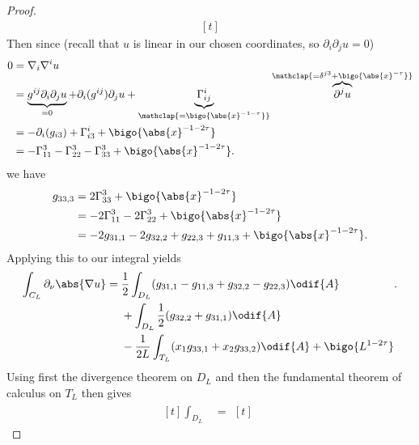 \documentclass[titlepage,numbers=noenddot,oneside,%
cleardoublepage=empty,paper=a4,fontsize=11pt,%
english,%
]{scrartcl}
\begin{document}
\begin{proof}
\begin{equation}
\begin{aligned}[t]
        \end{aligned}
    \end{equation}
    Then since (recall that \( u \) is linear in our chosen coordinates, so \( \partial_i\partial_j u=0 \))
    \begin{equation*}
        \begin{aligned}[t]
            0&=\nabla_i \nabla^i u\\
            &=\underbrace{g^{ij}\partial_i \partial_j u}_{=0}+\partial_i(g^{ij}) \partial_j u+\underbrace{\Gamma^{i}_{ij}}_{\mathclap{=\bigo{\abs{x}^{-1-\tau}}}}\overbrace{\partial^j u}^{\smash{\mathclap{=\delta^{j3}+\bigo{\abs{x}^{-\tau}}}}}\\
            &=-\partial_i(g_{i3})+\Gamma^i_{i3}+\bigo{\abs{x}^{-1-2\tau}}\\
            &=-\Gamma^3_{11}-\Gamma^3_{22}-\Gamma^3_{33}+\bigo{\abs{x}^{-1-2\tau}}.
        \end{aligned}
    \end{equation*}
    we have
    \begin{equation*}
        \begin{aligned}[t]
            g_{33,3}&=2\Gamma_{33}^3+\bigo{\abs{x}^{-1-2\tau}}\\
            &=-2\Gamma_{11}^3-2\Gamma_{22}^3+\bigo{\abs{x}^{-1-2\tau}}\\
            &=-2g_{31,1}-2g_{32,2}+g_{22,3}+g_{11,3}+\bigo{\abs{x}^{-1-2\tau}}.
        \end{aligned}
    \end{equation*}
    Applying this to our integral yields
    \begin{equation*}
            \int_{C_L} \partial_{\nu}\abs{\nabla u}=\begin{aligned}[t]
                &\frac{1}{2}\int_{D_L}(g_{31,1}-g_{11,3}+g_{32,2}-g_{22,3})\odif{A}\\
                &+\int_{D_L}\frac{1}{2}(g_{32,2}+g_{31,1})\odif{A}\\
                &-\frac{1}{2L}\int_{T_L}(x_1 g_{33,1}+x_2 g_{33,2})\odif{A}+\bigo{L^{1-2\tau}}
            \end{aligned}.
    \end{equation*}
    Using first the divergence theorem on \( D_L \) and then the fundamental theorem of calculus on \( T_L \) then gives
    \begin{equation*}
        \begin{aligned}[t]
            \int_{D_L}&=\begin{aligned}[t]

\end{aligned}
\end{aligned}
\end{equation*}
\end{proof}
\end{document}
